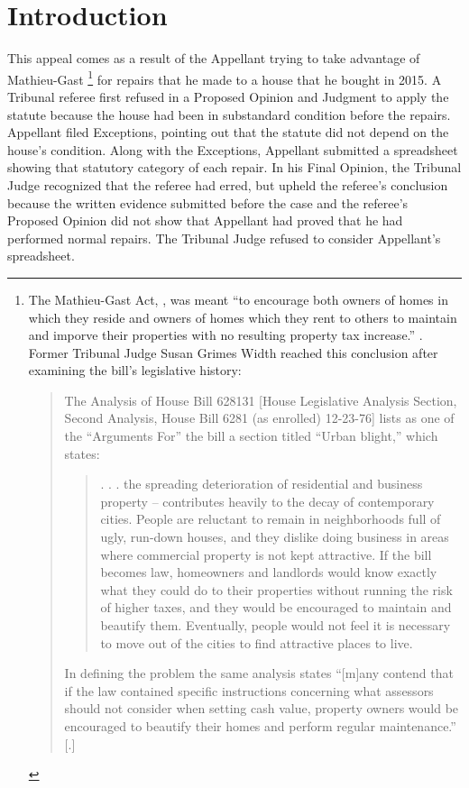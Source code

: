 \documentclass[12pt,\documentclassflag]{michiganCourtOfAppealsBrief}
\begin{document}
\section{Introduction}

This appeal comes as a result of the Appellant trying to take advantage of Mathieu-Gast%
\footnote{The Mathieu-Gast Act, \mathieuGast, was meant ``to encourage both owners of homes in which they reside and owners of homes which they rent to others to maintain and imporve their properties with no resulting property tax increase.'' .
Former Tribunal Judge Susan Grimes Width reached this conclusion after examining the bill's legislative history:
  \begin{quotation}
    The Analysis of House Bill 628131 [House Legislative Analysis Section, Second Analysis, House Bill 6281 (as enrolled) 12-23-76] lists as one of the ``Arguments For'' the bill a section titled
``Urban blight,'' which states:
\begin{quote}
  . . . the spreading deterioration of residential and business property -- contributes
heavily to the decay of contemporary cities. People are reluctant to remain in
neighborhoods full of ugly, run-down houses, and they dislike doing business in
areas where commercial property is not kept attractive. If the bill becomes law,
homeowners and landlords would know exactly what they could do to their
properties without running the risk of higher taxes, and they would be encouraged
to maintain and beautify them. Eventually, people would not feel it is necessary to
move out of the cities to find attractive places to live.
\end{quote}

In defining the problem the same analysis states ``[m]any contend that if the law contained
specific instructions concerning what assessors should not consider when setting cash value,
property owners would be encouraged to beautify their homes and perform regular
maintenance.'' [.]
\end{quotation}
}
for repairs that he made to a house that he bought in 2015. A Tribunal referee first refused in a Proposed Opinion and Judgment to apply the statute because the house had been in substandard condition before the repairs. Appellant filed Exceptions, pointing out that the statute did not depend on the house's condition. Along with the Exceptions, Appellant submitted a spreadsheet showing that statutory category of each repair. In his Final Opinion, the Tribunal Judge recognized that the referee had erred, but upheld the referee's conclusion because the written evidence submitted before the case and the referee's Proposed Opinion did not show that Appellant had proved that he had performed normal repairs. The Tribunal Judge refused to consider Appellant's spreadsheet.
\end{document}
